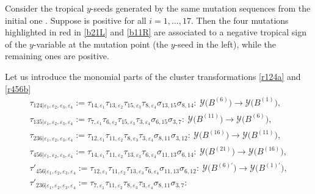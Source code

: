 \begin{Remark}\label{re:red}
 Consider the tropical $y$-seeds generated by the same mutation
 sequences from the initial one
 . Suppose
  is positive for all $i=1, \dots,
 17$. Then the four mutations highlighted in red in \eqref{b21L}
 and \eqref{b11R} are associated to a negative tropical sign of the
 $y$-variable at the mutation point (the $y$-seed in the left), while
 the remaining ones are positive.
\end{Remark}

Let us introduce the monomial parts of the cluster transformations \eqref{r124a} and \eqref{r456b}
\begin{gather*}
\tau_{124 | \varepsilon_1,\varepsilon_2,\varepsilon_3,\varepsilon_4} :=
\tau_{14,\varepsilon_1}\tau_{13,\varepsilon_2}\tau_{15,\varepsilon_3}\tau_{8,\varepsilon_4}\sigma_{13,15}\sigma_{8,14}\colon\
 \mathcal{Y}\bigl(B^{(6)}\bigr) \rightarrow \mathcal{Y}\bigl(B^{(1)}\bigr),
\\
\tau_{135 | \varepsilon_1,\varepsilon_2,\varepsilon_3,\varepsilon_4} :=
\tau_{7,\varepsilon_1}\tau_{6,\varepsilon_2}\tau_{15,\varepsilon_3}\tau_{3,\varepsilon_4}\sigma_{6,15}\sigma_{3,7}\colon\
 \mathcal{Y}\bigl(B^{(11)}\bigr) \rightarrow \mathcal{Y}\bigl(B^{(6)}\bigr),
\\
\tau_{236 | \varepsilon_1,\varepsilon_2,\varepsilon_3,\varepsilon_4} :=
\tau_{12,\varepsilon_1}\tau_{11,\varepsilon_2}\tau_{8,\varepsilon_3}\tau_{3,\varepsilon_4}\sigma_{8,11}\sigma_{3,12}\colon\
 \mathcal{Y}\bigl(B^{(16)}\bigr) \rightarrow \mathcal{Y}\bigl(B^{(11)}\bigr),
\\
\tau_{456 | \varepsilon_1,\varepsilon_2,\varepsilon_3,\varepsilon_4} :=
\tau_{14,\varepsilon_1}\tau_{11,\varepsilon_2}\tau_{13,\varepsilon_3}\tau_{6,\varepsilon_4}\sigma_{11,13}\sigma_{6,14}\colon\
 \mathcal{Y}\bigl(B^{(21)}\bigr) \rightarrow \mathcal{Y}\bigl(B^{(16)}\bigr),
\\
\tau'_{456 | \varepsilon_1,\varepsilon_2,\varepsilon_3,\varepsilon_4} :=
\tau_{12,\varepsilon_1}\tau_{11,\varepsilon_2}\tau_{13,\varepsilon_3}\tau_{6,\varepsilon_4}\sigma_{11,13}\sigma_{6,12}\colon\
 \mathcal{Y}\bigl(B^{(6)\prime}\bigr) \rightarrow \mathcal{Y}\bigl(B^{(1)\prime}\bigr),
\\
\tau'_{236 | \varepsilon_1,\varepsilon_2,\varepsilon_3,\varepsilon_4} :=
\tau_{7,\varepsilon_1}\tau_{11,\varepsilon_2}\tau_{8,\varepsilon_3}\tau_{3,\varepsilon_4}\sigma_{8,11}\sigma_{3,7}\colon\

\end{gather*}
